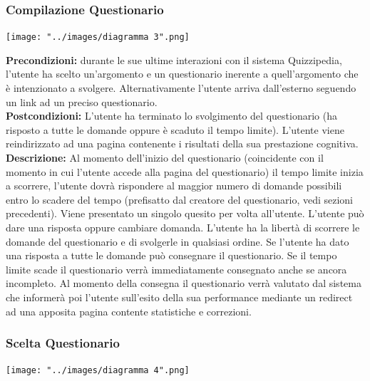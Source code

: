 \documentclass[a4paper,11pt]{article}
\begin{document}
\subsubsection{Compilazione Questionario}
\begin{center}
	\texttt{[image: "../images/diagramma 3".png]}
\end{center}
\textbf{Precondizioni:} durante le sue ultime interazioni con il sistema Quizzipedia, l'utente ha scelto un'argomento e un questionario inerente a quell'argomento che è intenzionato a svolgere. Alternativamente l'utente arriva dall'esterno seguendo un link ad un preciso questionario.\\
\textbf{Postcondizioni:} L'utente ha terminato lo svolgimento del questionario (ha risposto a tutte le domande oppure è scaduto il tempo limite). L'utente viene reindirizzato ad una pagina contenente i risultati della sua prestazione cognitiva.\\
\textbf{Descrizione:} Al momento dell'inizio del questionario (coincidente con il momento in cui l'utente accede alla pagina del questionario) il tempo limite inizia a scorrere, l'utente dovrà rispondere al maggior numero di domande possibili entro lo scadere del tempo (prefisatto dal creatore del questionario, vedi sezioni precedenti). Viene presentato un singolo quesito per volta all'utente. L'utente può dare una risposta oppure cambiare domanda. L'utente ha la libertà di scorrere le domande del questionario e di svolgerle in qualsiasi ordine. Se l'utente ha dato una risposta a tutte le domande può consegnare il questionario. Se il tempo limite scade il questionario verrà immediatamente consegnato anche se ancora incompleto. Al momento della consegna il questionario verrà valutato dal sistema che informerà poi l'utente sull'esito della sua performance mediante un redirect ad una apposita pagina contente statistiche e correzioni.\\
\newpage
\subsubsection{Scelta Questionario}
\begin{center}
	\texttt{[image: "../images/diagramma 4".png]}
\end{center}
\end{document}
